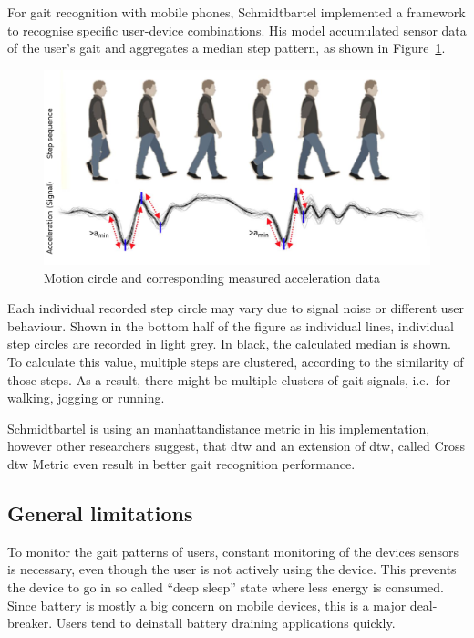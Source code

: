 For gait recognition with mobile phones, Schmidtbartel\cite{thesisschmidbartl} implemented a framework to recognise specific user-device combinations. His model accumulated sensor data of the user's gait and aggregates a median step pattern, as shown in Figure~\ref{fig:gaitacceleration}. 
\begin{figure}
    \centering
    \includegraphics[width=\textwidth]{figures/GaitAcceleration.png}
    \caption{Motion circle and corresponding measured acceleration data\cite{thesisschmidbartl}}
    \label{fig:gaitacceleration}
\end{figure}

Each individual recorded step circle may vary due to signal noise or different user behaviour. Shown in the bottom half of the figure as individual lines, individual step circles are recorded in light grey. In black, the calculated median is shown. To calculate this value, multiple steps are clustered, according to the similarity of those steps. As a result, there might be multiple clusters of gait signals, i.e.\ for walking, jogging or running.

Schmidtbartel is using an \gls{manhattandistance} metric in his implementation, however other researchers\cite{derawi2013gait} suggest, that \gls{dtw} and an extension of \gls{dtw}, called Cross \gls{dtw} Metric even result in better gait recognition performance.

\subsection{General limitations}
To monitor the gait patterns of users, constant monitoring of the devices sensors is necessary, even though the user is not actively using the device. This prevents the device to go in so called ``deep sleep'' state where less energy is consumed. Since battery is mostly a big concern on mobile devices, this is a major deal-breaker. Users tend to deinstall battery draining applications quickly.

